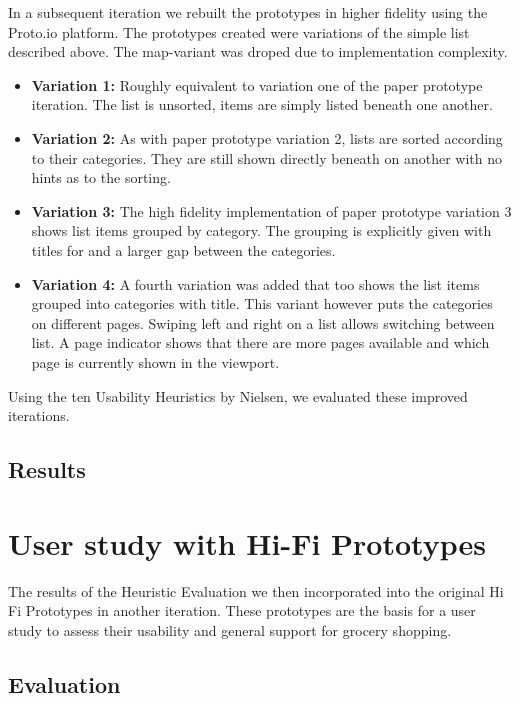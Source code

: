 \documentclass{article}
\begin{document}
\begin{itemize}
\begin{itemize}
In a subsequent iteration we rebuilt the prototypes in higher fidelity using the Proto.io platform.
The prototypes created were variations of the simple list described above. The map-variant was droped due to implementation complexity.
\begin{itemize}
    \item \textbf{Variation 1:} Roughly equivalent to variation one of the paper prototype iteration. 
        The list is unsorted, items are simply listed beneath one another.
    \item \textbf{Variation 2:} As with paper prototype variation 2, lists are sorted according to their categories. 
        They are still shown directly beneath on another with no hints as to the sorting.
    \item \textbf{Variation 3:} The high fidelity implementation of paper prototype variation 3 shows list items grouped by category.
        The grouping is explicitly given with titles for and a larger gap between the categories.
    \item \textbf{Variation 4:} A fourth variation was added that too shows the list items grouped into categories with title.
        This variant however puts the categories on different pages. Swiping left and right on a list allows switching between list.
        A page indicator shows that there are more pages available and which page is currently shown in the viewport.
\end{itemize}

Using the ten Usability Heuristics by Nielsen, we evaluated these improved iterations.

    \subsection{Results}

\section{User study with Hi-Fi Prototypes}

The results of the Heuristic Evaluation we then incorporated into the original Hi Fi Prototypes in another iteration.
These prototypes are the basis for a user study to assess their usability and general support for grocery shopping.

\subsection{Evaluation}

\end{itemize}
\end{itemize}
\end{document}
